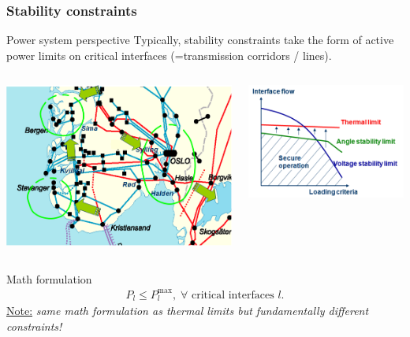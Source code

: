 \documentclass[compress]{beamer}
\begin{document}
\begin{frame}
\frametitle{Stability constraints}
\begin{block}{Power system perspective}
Typically, stability constraints take the form of active power limits on critical interfaces (=transmission corridors / lines). 

\begin{columns}
\begin{column}{0.45\textwidth}
\includegraphics[width=1\textwidth]{Figs/Hasle.png}    
\end{column}
\begin{column}{0.45\textwidth}
\includegraphics[width=1\textwidth]{Figs/SecurityLimits.png}
\end{column}
\end{columns}  
\end{block}
\begin{block}{Math formulation}
  \begin{align*}
    P_l \leq P_l^{\text{max}}, \; \forall \text{ critical interfaces } l.
  \end{align*}
\underline{Note:} \emph{same math formulation as thermal limits but fundamentally different constraints!}
\end{block}
\end{frame}
\end{document}
